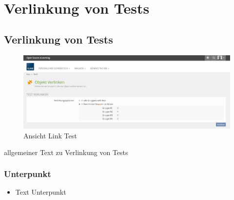 \chapter{Verlinkung von Tests}\label{linkTest}
\minitoc
\clearpage

\section{Verlinkung von Tests}
\begin{figure}
	\centering
	\includegraphics[width=1\textwidth]{img/linkTest.png}
	\caption{Ansicht Link Test}
\end{figure}

allgemeiner Text zu Verlinkung von Tests 

\subsection*{Unterpunkt}
\begin{itemize}
	\item Text Unterpunkt
\end{itemize}

\clearpage